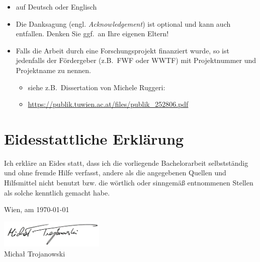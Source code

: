 \documentclass[a4paper,11pt,bibliography=totoc,listof=totoc,headinclude=true,cleardoublepage=empty,oneside]{scrbook}
\begin{document}
{\color{change}
\begin{itemize}
\item auf Deutsch oder Englisch
\item Die Danksagung (engl. {\em Acknowledgement}) ist optional und kann auch entfallen. Denken Sie ggf.\ an Ihre eigenen Eltern!

\item Falls die Arbeit durch eine Forschungsprojekt finanziert wurde, so ist jedenfalls der Fördergeber (z.B.\ FWF oder WWTF) mit Projektnummer und Projektname zu nennen.
\begin{itemize}
\item siehe z.B.\ Dissertation von Michele Ruggeri:
\item[] \href{https://publik.tuwien.ac.at/files/publik_252806.pdf}{\ttfamily https://publik.tuwien.ac.at/files/publik\_252806.pdf}
\end{itemize}

\end{itemize}
}

\cleardoublepage


\chapter*{Eidesstattliche Erkl\"arung}
\thispagestyle{empty}
\thispagestyle{empty}

\vspace*{2cm}

Ich erkl\"are an Eides statt, dass ich die vorliegende Bachelorarbeit selbstst\"andig und ohne fremde Hilfe verfasst, andere als die angegebenen Quellen und Hilfsmittel nicht benutzt bzw. die w\"ortlich oder sinngem\"a{\ss} entnommenen Stellen als solche kenntlich gemacht habe.

\vspace*{3cm}

\noindent
Wien, am \today
%
\hfill 
%
\begin{minipage}[t]{5cm}
\centering
\underline{\includegraphics[width=5cm]{latex//images//MT.png}}\\
\small{Michał Trojanowski}
\end{minipage}
\end{document}
